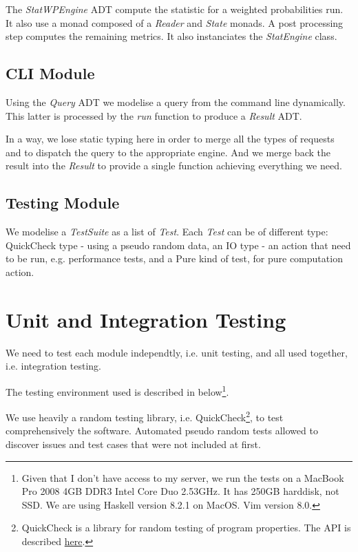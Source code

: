 \documentclass[12pt,a4paper,article]{memoir} %
\begin{document}
The \emph{StatWPEngine} ADT compute the statistic for a weighted
probabilities run. It also use a monad composed of a \emph{Reader}
and \emph{State} monads. A post processing step computes
the remaining metrics. It also instanciates the \emph{StatEngine} class.

\subsection{CLI Module}
Using the \emph{Query} ADT we modelise a query from the command line
dynamically. This latter is processed by the \emph{run} function to 
produce a  \emph{Result} ADT.

In a way, we lose static typing here in order to merge all the types of 
requests and to dispatch the query to the appropriate engine. And we merge
back the result into the \emph{Result} to provide a single function achieving
everything we need.

\subsection{Testing Module}
We modelise a \emph{TestSuite} as a list of \emph{Test}.
Each \emph{Test} can be of different type: QuickCheck type - 
using a pseudo random data, 
an IO type - an action that need to be run, e.g. performance tests, 
and a Pure kind of test, for pure computation action.

\section{Unit and Integration Testing}
We need to test each module independtly, i.e. unit testing, and all used 
together, i.e. integration testing.

The testing environment used is described in below\footnote{
Given that I don't have access to my server, 
we run the tests on a MacBook Pro 2008 4GB DDR3 Intel Core Duo 2.53GHz.
It has 250GB harddisk, not SSD. 
We are using Haskell version 8.2.1 on MacOS. Vim version 8.0.
}.

We use heavily a random testing library, i.e. QuickCheck\footnote{
QuickCheck is a library for random testing of program properties.
The API is described 
\href{http://hackage.haskell.org/package/QuickCheck-2.10.0.1/docs/Test-QuickCheck.html}{here}.
}, to test comprehensively the software.
Automated pseudo random tests allowed to discover issues and
test cases that were not included at first.
\end{document}
